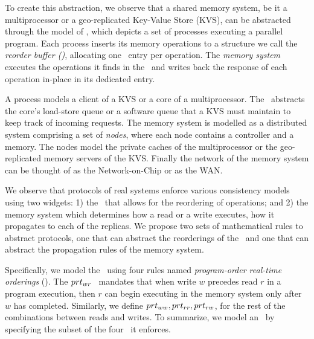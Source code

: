 
To create this abstraction, we observe that a shared memory system, be it a multiprocessor or a geo-replicated Key-Value Store (KVS), can be abstracted through the model of , which depicts a set of processes executing a parallel program. 
Each process inserts its memory operations to a structure we call the \emph{reorder buffer (\rob)},  allocating one \rob\ entry per operation.
The \emph{memory system} executes the operations it finds in the \rob\ and writes back the response of each operation in-place in its dedicated entry.

A process models a client of a KVS or a core of a multiprocessor. The \rob\ abstracts the core's load-store queue or a software queue that a KVS must maintain to keep track of incoming requests.
The memory system is modelled as a distributed system comprising a set of \emph{nodes}, where each node contains a controller and a memory.
The nodes model the private caches of the multiprocessor or the geo-replicated memory servers of the KVS. Finally the network of the memory system can be thought of as the Network-on-Chip or as the WAN.

We observe that protocols of real systems enforce various consistency models using two widgets: 1) the \rob\ that allows for the reordering of operations; and 2) the memory system which determines how a read or a write executes, \ie how it propagates to each of the replicas. 
We propose two sets of mathematical rules to abstract protocols, one that can abstract the reorderings of the \rob\ and one that can abstract the propagation rules of the memory system.



Specifically, we model the \rob\ using four rules named \emph{program-order real-time orderings} (\emph{\prts}).
The $prt_{wr}$ \prt\ mandates that when write $w$ precedes read $r$ in a program execution, then $r$ can begin executing in the memory system only after $w$ has completed.
Similarly, we define $prt_{ww},prt_{rr}, prt_{rw}$, for the rest of the combinations between reads and writes.
To summarize, we model an \rob\ by specifying the subset of the four \prts\ it enforces. 

